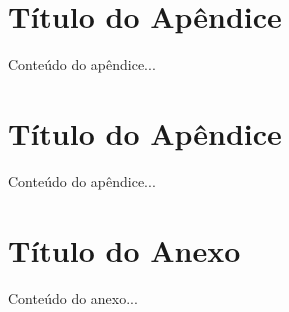 \documentclass{eic-bcc-tcc}
\begin{document}
\backmatter


\appendix
\chapter{Título do Apêndice}
Conteúdo do apêndice...

\chapter{Título do Apêndice}
Conteúdo do apêndice...

\anexos
\chapter{Título do Anexo}
Conteúdo do anexo...
\end{document}
